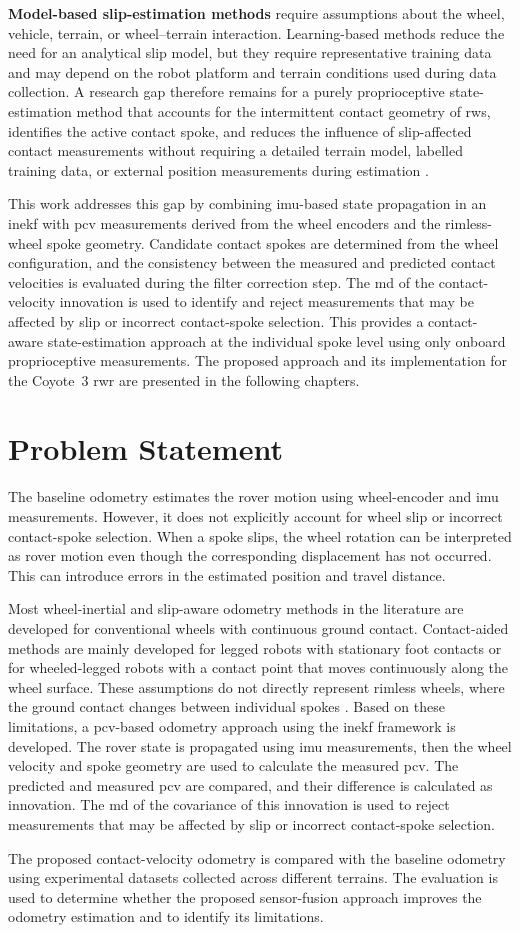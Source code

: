 \documentclass[report.tex]{subfiles}
\begin{document}
    \textbf{Model-based slip-estimation methods} require assumptions about the wheel, vehicle, terrain, or wheel--terrain interaction. Learning-based methods reduce the need for an analytical slip model, but they require representative training data and may depend on the robot platform and terrain conditions used during data collection. A research gap therefore remains for a purely proprioceptive state-estimation method that accounts for the intermittent contact geometry of \glspl{rw}, identifies the active contact spoke, and reduces the influence of slip-affected contact measurements without requiring a detailed terrain model, labelled training data, or external position measurements during estimation \cite{Kruger2019, Reginald2025, Brossard2019}.

    This work addresses this gap by combining \gls{imu}-based state propagation in an \gls{inekf} with \gls{pcv} measurements derived from the wheel encoders and the rimless-wheel spoke geometry. Candidate contact spokes are determined from the wheel configuration, and the consistency between the measured and predicted contact velocities is evaluated during the filter correction step. The \gls{md} of the contact-velocity innovation is used to identify and reject measurements that may be affected by slip or incorrect contact-spoke selection. This provides a contact-aware state-estimation approach at the individual spoke level using only onboard proprioceptive measurements. The proposed approach and its implementation for the Coyote~3 \gls{rwr} are presented in the following chapters.

\section{Problem Statement}

The baseline odometry estimates the rover motion using wheel-encoder and \gls{imu} measurements. However, it does not explicitly account for wheel slip or incorrect contact-spoke selection. When a spoke slips, the wheel rotation can be interpreted as rover motion even though the corresponding displacement has not occurred. This can introduce errors in the estimated position and travel distance.

Most wheel-inertial and slip-aware odometry methods in the literature are developed for conventional wheels with continuous ground contact. Contact-aided methods are mainly developed for legged robots with stationary foot contacts or for wheeled-legged robots with a contact point that moves continuously along the wheel surface. These assumptions do not directly represent rimless wheels, where the ground contact changes between individual spokes \cite{Hartley2018ContactAidedInEKF,Liu2020,Zhou2025}. Based on these limitations, a \gls{pcv}-based odometry approach using the \gls{inekf} framework is developed. The rover state is propagated using \gls{imu} measurements, then the wheel velocity and spoke geometry are used to calculate the measured \gls{pcv}. The predicted and measured \gls{pcv} are compared, and their difference is calculated as innovation. The \gls{md} of the covariance of this innovation is used to reject measurements that may be affected by slip or incorrect contact-spoke selection.

The proposed contact-velocity odometry is compared with the baseline odometry using experimental datasets collected across different terrains. The evaluation is used to determine whether the proposed sensor-fusion approach improves the odometry estimation and to identify its limitations.
    
\end{document}
